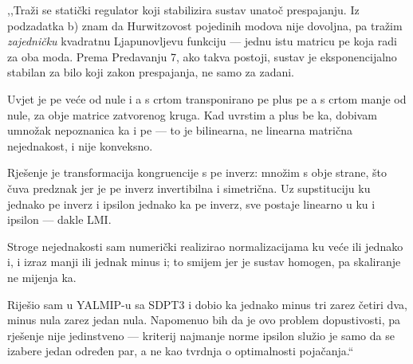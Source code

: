 \begin{izgovor}
,,Traži se statički regulator koji stabilizira sustav unatoč prespajanju. Iz
podzadatka b) znam da Hurwitzovost pojedinih modova nije dovoljna, pa tražim
\emph{zajedničku} kvadratnu Ljapunovljevu funkciju --- jednu istu matricu pe koja
radi za oba moda. Prema Predavanju 7, ako takva postoji, sustav je eksponencijalno
stabilan za bilo koji zakon prespajanja, ne samo za zadani.

Uvjet je pe veće od nule i a s crtom transponirano pe plus pe a s crtom manje od
nule, za obje matrice zatvorenog kruga. Kad uvrstim a plus be ka, dobivam umnožak
nepoznanica ka i pe --- to je bilinearna, ne linearna matrična nejednakost, i
nije konveksno.

Rješenje je transformacija kongruencije s pe inverz: množim s obje strane, što
čuva predznak jer je pe inverz invertibilna i simetrična. Uz supstituciju ku
jednako pe inverz i ipsilon jednako ka pe inverz, sve postaje linearno u ku i
ipsilon --- dakle LMI.

Stroge nejednakosti sam numerički realizirao normalizacijama ku veće ili jednako
i, i izraz manji ili jednak minus i; to smijem jer je sustav homogen, pa
skaliranje ne mijenja ka.

Riješio sam u YALMIP-u sa SDPT3 i dobio ka jednako minus tri zarez četiri dva,
minus nula zarez jedan nula. Napomenuo bih da je ovo problem dopustivosti, pa
rješenje nije jedinstveno --- kriterij najmanje norme ipsilon služio je samo da
se izabere jedan određen par, a ne kao tvrdnja o optimalnosti pojačanja.``
\end{izgovor}
